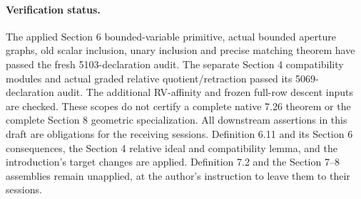 \paragraph{Verification status.}
The applied Section 6 bounded-variable primitive, actual bounded
aperture graphs, old scalar inclusion, unary inclusion and precise
matching theorem have passed the fresh 5103-declaration audit.
The separate Section 4 compatibility modules and actual graded
relative quotient/retraction passed its 5069-declaration audit.
The additional RV-affinity and frozen full-row descent inputs are
checked. These scopes do not certify a complete native 7.26 theorem
or the complete Section 8 geometric specialization. All downstream
assertions in this draft are obligations for the receiving sessions.
Definition 6.11 and its Section 6 consequences, the Section 4 relative
ideal and compatibility lemma, and the introduction's target changes
are applied. Definition 7.2 and the Section 7--8 assemblies remain
unapplied, at the author's instruction to leave them to their sessions.
